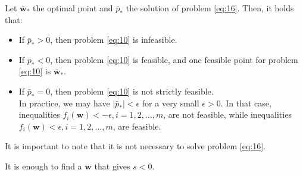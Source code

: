 \documentclass{beamer}
\begin{document}
\begin{frame}


\justifying
Let $\mathbf{\bar{w}}_{*}$ the optimal point and $\bar{p}_{*}$ the solution of problem \eqref{eq:16}. Then, it holds that:
\begin{itemize}
	\item If $\bar{p}_{*} > 0$, then problem \eqref{eq:10} is infeasible.
	\item If $\bar{p}_{*} < 0$, then problem \eqref{eq:10} is feasible, and one feasible point for problem \eqref{eq:10} is $\mathbf{\bar{w}}_{*}.$
	\justifying
	\item If $\bar{p}_{*} = 0$, then problem \eqref{eq:10} is not strictly feasible.\\In practice, we may have $|\bar{p}_{*}| < \epsilon$ for a very small $\epsilon > 0$. In that case, inequalities $f_{i}\left(\mathbf{w}\right) < - \epsilon, i =1,2,\dots,m$, are not feasible, while inequalities $f_{i}\left(\mathbf{w}\right) < \epsilon, i =1,2,\dots,m$, are feasible.
\end{itemize}

\vspace{0.8cm}
\justifying
It is important to note that it is not necessary to solve problem \eqref{eq:16}.

\vspace{0.4cm}
\justifying
It is enough to find a $\mathbf{w}$ that gives $s < 0$.


\end{frame}
\end{document}
